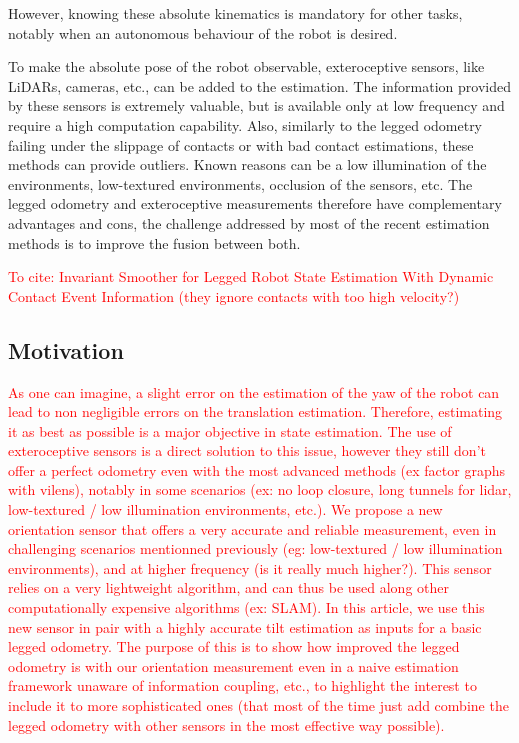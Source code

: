 \documentclass{IJCAS}
\begin{document}
    However, knowing these absolute kinematics is mandatory for other tasks, notably when an autonomous behaviour of the robot is desired. 
    
    To make the absolute pose of the robot observable, exteroceptive sensors, like LiDARs, cameras, etc., can be added to the estimation. The information provided by these sensors is extremely valuable, but is available only at low frequency and require a high computation capability. Also, similarly to the legged odometry failing under the slippage of contacts or with bad contact estimations, these methods can provide outliers. Known reasons can be a low illumination of the environments, low-textured environments, occlusion of the sensors, etc. The legged odometry and exteroceptive measurements therefore have complementary advantages and cons, the challenge addressed by most of the recent estimation methods is to improve the fusion between both.
    

    \textcolor{red}{To cite: Invariant Smoother for Legged Robot State 	Estimation With Dynamic Contact Event Information (they ignore contacts with too high velocity?)}
   
\subsection{Motivation}
    
\textcolor{red}{
As one can imagine, a slight error on the estimation of the yaw of the robot can lead to non negligible errors on the translation estimation. Therefore, estimating it as best as possible is a major objective in state estimation. The use of exteroceptive sensors is a direct solution to this issue, however they still don't offer a perfect odometry even with the most advanced methods (ex factor graphs with vilens), notably in some scenarios (ex: no loop closure, long tunnels for lidar, low-textured / low illumination environments, etc.). We propose a new orientation sensor that offers a very accurate and reliable measurement, even in challenging scenarios mentionned previously (eg: low-textured / low illumination environments), and at higher frequency (is it really much higher?). This sensor relies on a very lightweight algorithm, and can thus be used along other computationally expensive algorithms (ex: SLAM). In this article, we use this new sensor in pair with a highly accurate tilt estimation as inputs for a basic legged odometry. The purpose of this is to show how improved the legged odometry is with our orientation measurement even in a naive estimation framework unaware of information coupling, etc., to highlight the interest to include it  to more sophisticated ones (that most of the time just add combine the legged odometry with other sensors in the most effective way possible).}
    
\end{document}
